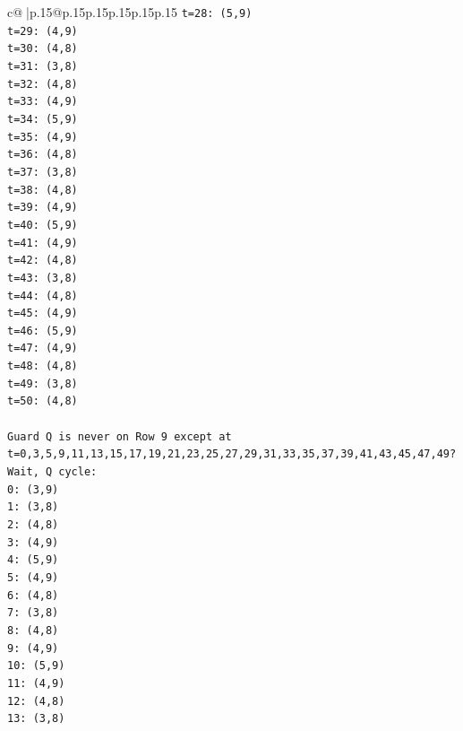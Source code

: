 \documentclass{article}
\begin{document}
{\begin{supertabular}{c@{$\;$}|p{.15\linewidth}@{}p{.15\linewidth}p{.15\linewidth}p{.15\linewidth}p{.15\linewidth}p{.15\linewidth}}
{{{\texttt{t=28: (5,9)} \\
\texttt{t=29: (4,9)} \\
\texttt{t=30: (4,8)} \\
\texttt{t=31: (3,8)} \\
\texttt{t=32: (4,8)} \\
\texttt{t=33: (4,9)} \\
\texttt{t=34: (5,9)} \\
\texttt{t=35: (4,9)} \\
\texttt{t=36: (4,8)} \\
\texttt{t=37: (3,8)} \\
\texttt{t=38: (4,8)} \\
\texttt{t=39: (4,9)} \\
\texttt{t=40: (5,9)} \\
\texttt{t=41: (4,9)} \\
\texttt{t=42: (4,8)} \\
\texttt{t=43: (3,8)} \\
\texttt{t=44: (4,8)} \\
\texttt{t=45: (4,9)} \\
\texttt{t=46: (5,9)} \\
\texttt{t=47: (4,9)} \\
\texttt{t=48: (4,8)} \\
\texttt{t=49: (3,8)} \\
\texttt{t=50: (4,8)} \\
\\ 
\texttt{Guard Q is never on Row 9 except at t=0,3,5,9,11,13,15,17,19,21,23,25,27,29,31,33,35,37,39,41,43,45,47,49?} \\
\texttt{Wait, Q cycle:} \\
\texttt{0: (3,9)} \\
\texttt{1: (3,8)} \\
\texttt{2: (4,8)} \\
\texttt{3: (4,9)} \\
\texttt{4: (5,9)} \\
\texttt{5: (4,9)} \\
\texttt{6: (4,8)} \\
\texttt{7: (3,8)} \\
\texttt{8: (4,8)} \\
\texttt{9: (4,9)} \\
\texttt{10: (5,9)} \\
\texttt{11: (4,9)} \\
\texttt{12: (4,8)} \\
\texttt{13: (3,8)} \\
}}}
\end{supertabular}}
\end{document}
